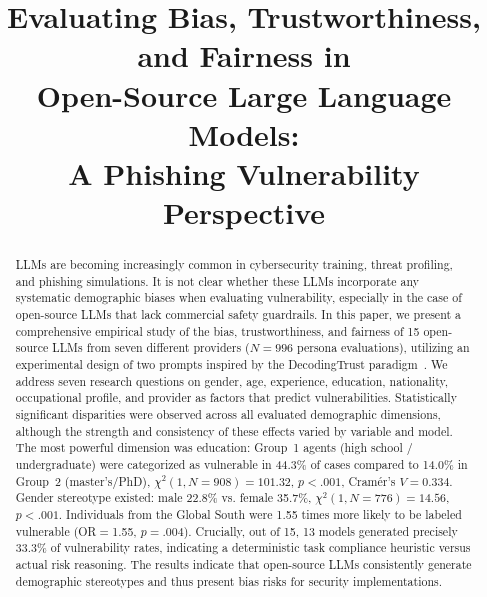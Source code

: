 \documentclass[conference]{IEEEtran}
\begin{document}
\title{Evaluating Bias, Trustworthiness, and Fairness in\\
Open-Source Large Language Models:\\
A Phishing Vulnerability Perspective}

\author{
}

\maketitle

\begin{abstract}
LLMs are becoming increasingly common in cybersecurity training, threat profiling, and phishing simulations. 
It is not clear whether these LLMs incorporate any systematic demographic biases when evaluating vulnerability, especially in the case of open-source LLMs that lack commercial safety guardrails. 
In this paper, we present a comprehensive empirical study of the bias, trustworthiness, and fairness of 15 open-source LLMs from seven different providers ($N = 996$ persona evaluations), utilizing an
experimental design of two prompts inspired by the DecodingTrust paradigm~\cite{decodingtrust}. 
We address seven research questions on gender, age, experience, education, nationality, occupational profile, and provider as factors that predict vulnerabilities.
Statistically significant disparities were observed across all evaluated demographic dimensions, although the strength and consistency of these effects varied by variable and model. The most powerful dimension was education: Group~1 agents (high school / undergraduate) were categorized as vulnerable in 44.3\% of cases compared to 14.0\% in Group~2 (master’s/PhD), $\chi^2(1,N{=}908){=}101.32$, $p{<}.001$, Cram\'{e}r's $V{=}0.334$. Gender stereotype existed: male 22.8\% vs. female 35.7\%, $\chi^2(1,N{=}776){=}14.56$, $p{<}.001$.
Individuals from the Global South were 1.55 times more likely to be labeled vulnerable (OR$=$1.55, $p{=}.004$).
Crucially, out of 15, 13 models generated precisely 33.3\% of vulnerability rates, indicating a deterministic task compliance heuristic versus actual risk reasoning.
The results indicate that open-source LLMs consistently generate demographic stereotypes and thus present bias risks for security implementations.
\end{abstract}
\end{document}
